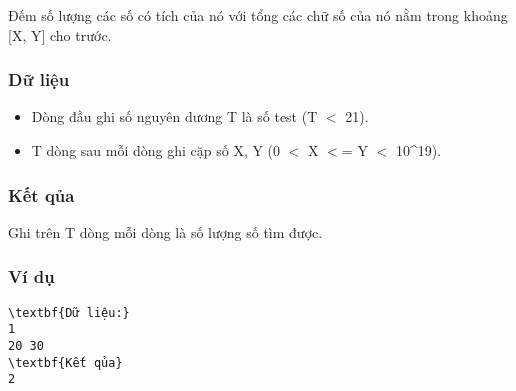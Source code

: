 



   Đếm số lượng các số có tích của nó với tổng các chữ số của nó nằm trong khoảng [X, Y] cho trước.  

\subsubsection{   Dữ liệu  }
\begin{itemize}
	\item     Dòng đầu ghi số nguyên dương T là số test (T $<$ 21).   
	\item     T dòng sau mỗi dòng ghi cặp số X, Y (0 $<$ X $<$= Y $<$ 10\textasciicircum19).   
\end{itemize}

\subsubsection{   Kết qủa  }

   Ghi trên T dòng mỗi dòng là số lượng số tìm được.  

\subsubsection{   Ví dụ  }
\begin{verbatim}
\textbf{Dữ liệu:} 
1
20 30
\textbf{Kết qủa} 
2
\end{verbatim}